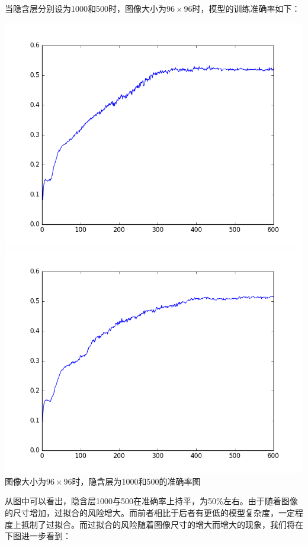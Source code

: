 当隐含层分别设为1000和500时，图像大小为$96\times 96$时，模型的训练准确率如下：
\begin{center}
\includegraphics[scale=0.4]{../figures/Log/BP_new2/BP_new2_acc.png}
\includegraphics[scale=0.4]{../figures/Log/BP_new5/BP_new5_acc.png} \\
图像大小为$96\times 96$时，隐含层为1000和500的准确率图
\end{center}
从图中可以看出，隐含层1000与500在准确率上持平，为50\%左右。由于随着图像的尺寸增加，过拟合的风险增大。而前者相比于后者有更低的模型复杂度，一定程度上抵制了过拟合。而过拟合的风险随着图像尺寸的增大而增大的现象，我们将在下图进一步看到：

